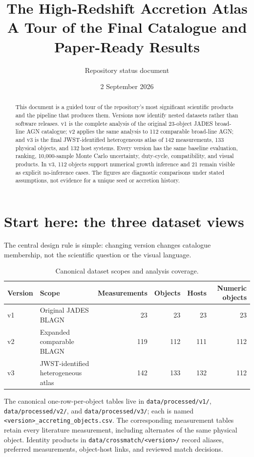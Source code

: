 \documentclass[10.5pt]{article}
\title{\textbf{The High-Redshift Accretion Atlas}\\
\large A Tour of the Final Catalogue and Paper-Ready Results}
\author{Repository status document}
\date{2 September 2026}
\newcommand{\repo}[1]{{\footnotesize\texttt{#1}}}
\begin{document}
\maketitle

\begin{abstract}
This document is a guided tour of the repository's most significant scientific
products and the pipeline that produces them. Versions now identify nested
datasets rather than software releases. v1 is the complete analysis of the
original 23-object JADES broad-line AGN catalogue; v2 applies the same analysis
to 112 comparable broad-line AGN; and v3 is the final JWST-identified
heterogeneous atlas of 142 measurements, 133 physical objects, and 132 host
systems. Every version has
the same baseline evaluation, ranking, 10,000-sample Monte Carlo uncertainty,
duty-cycle, compatibility, and visual products. In v3, 112 objects support
numerical growth inference and 21 remain visible as explicit no-inference
cases. The figures are diagnostic comparisons under stated assumptions, not
evidence for a unique seed or accretion history.
\end{abstract}

\section{Start here: the three dataset views}

The central design rule is simple: changing version changes catalogue
membership, not the scientific question or the visual language.

\begin{table}[h]
\centering
\caption{Canonical dataset scopes and analysis coverage.}
\begin{tabular}{@{}llrrrr@{}}
\toprule
Version & Scope & Measurements & Objects & Hosts & Numeric objects \\
\midrule
v1 & Original JADES BLAGN & 23 & 23 & 23 & 23 \\
v2 & Expanded comparable BLAGN & 119 & 112 & 111 & 112 \\
v3 & JWST-identified heterogeneous atlas & 142 & 133 & 132 & 112 \\
\bottomrule
\end{tabular}
\end{table}

The canonical one-row-per-object tables live in
\repo{data/processed/v1/}, \repo{data/processed/v2/}, and
\repo{data/processed/v3/}; each is named
\repo{<version>\_accreting\_objects.csv}. The corresponding measurement tables
retain every literature measurement, including alternates of the same physical
object. Identity products in \repo{data/crossmatch/<version>/} record aliases,
preferred measurements, object-host links, and reviewed match decisions.
\end{document}
